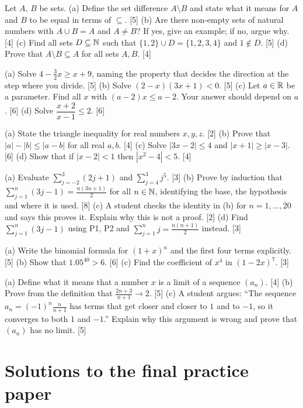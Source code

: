 \setcounter{pq}{0}
\renewcommand{\thepq}{F.\arabic{pq}}

\pq[18 marks] Let $A$, $B$ be sets.
(a) Define the set difference $A\setminus B$ and state what it means for $A$ and $B$ to be equal in terms of $\subseteq$. [5]
(b) Are there non-empty sets of natural numbers with $A\cup B=A$ and $A\ne B$? If yes, give an example; if no, argue why. [4]
(c) Find all sets $D\subseteq\mathbb{N}$ such that $\{1,2\}\cup D=\{1,2,3,4\}$ and $1\notin D$. [5]
(d) Prove that $A\setminus B\subseteq A$ for all sets $A,B$. [4]

\pq[22 marks]
(a) Solve $4-\tfrac{3}{2}x\ge x+9$, naming the property that decides the direction at the step where you divide. [5]
(b) Solve $(2-x)(3x+1)<0$. [5]
(c) Let $a\in\mathbb{R}$ be a parameter. Find all $x$ with $(a-2)x\le a-2$. Your answer should depend on $a$. [6]
(d) Solve $\dfrac{x+2}{x-1}\le 2$. [6]

\pq[16 marks]
(a) State the triangle inequality for real numbers $x,y,z$. [2]
(b) Prove that $|a|-|b|\le|a-b|$ for all real $a,b$. [4]
(c) Solve $|3x-2|\le 4$ and $|x+1|\ge|x-3|$. [6]
(d) Show that if $|x-2|<1$ then $|x^2-4|<5$. [4]

\pq[16 marks]
(a) Evaluate $\sum_{j=-2}^{3}(2j+1)$ and $\sum_{j=4}^{3}j^5$. [3]
(b) Prove by induction that $\sum_{j=1}^{n}(3j-1)=\frac{n(3n+1)}{2}$ for all $n\in\mathbb{N}$, identifying the base, the hypothesis and
where it is used. [8]
(c) A student checks the identity in (b) for $n=1,\dots,20$ and says this proves it. Explain why this is not a proof. [2]
(d) Find $\sum_{j=1}^{n}(3j-1)$ using P1, P2 and $\sum_{j=1}^nj=\frac{n(n+1)}2$ instead. [3]

\pq[14 marks]
(a) Write the binomial formula for $(1+x)^n$ and the first four terms explicitly. [5]
(b) Show that $1.05^{40}>6$. [6]
(c) Find the coefficient of $x^4$ in $(1-2x)^7$. [3]

\pq[14 marks]
(a) Define what it means that a number $x$ is a limit of a sequence $(a_n)$. [4]
(b) Prove from the definition that $\frac{2n+3}{n+1}\to2$. [5]
(c) A student argues: ``The sequence $a_n=(-1)^n\frac{n}{n+1}$ has terms that get closer and closer to $1$ and to $-1$, so it
converges to both $1$ and $-1$.'' Explain why this argument is wrong and prove that $(a_n)$ has no limit. [5]

\section*{Solutions to the final practice paper}

